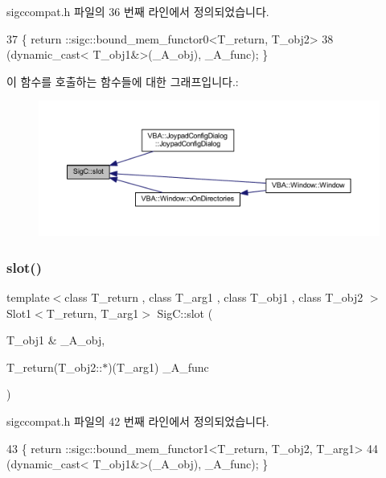 sigccompat.\+h 파일의 36 번째 라인에서 정의되었습니다.


\begin{DoxyCode}
37 \{ return ::sigc::bound\_mem\_functor0<T\_return, T\_obj2>
38              (\textcolor{keyword}{dynamic\_cast<} T\_obj1&\textcolor{keyword}{>}(\_A\_obj), \_A\_func); \}
\end{DoxyCode}
이 함수를 호출하는 함수들에 대한 그래프입니다.\+:
\nopagebreak
\begin{figure}[H]
\begin{center}
\leavevmode
\includegraphics[width=350pt]{namespace_sig_c_a92e4f19202b77e78ac1db05f5a62f6b6_icgraph}
\end{center}
\end{figure}
\mbox{\label{namespace_sig_c_a593d0d3f9fec3996bcdb781f14bff628}} 
\subsubsection{\texorpdfstring{slot()}{slot()}\hspace{0.1cm}{\footnotesize\ttfamily [2/3]}}
{\footnotesize\ttfamily template$<$class T\+\_\+return , class T\+\_\+arg1 , class T\+\_\+obj1 , class T\+\_\+obj2 $>$ \\
Slot1$<$T\+\_\+return, T\+\_\+arg1$>$ Sig\+C\+::slot (\begin{DoxyParamCaption}\item[{T\+\_\+obj1 \&}]{\+\_\+\+A\+\_\+obj,  }\item[{T\+\_\+return(T\+\_\+obj2\+::$\ast$)(T\+\_\+arg1)}]{\+\_\+\+A\+\_\+func }\end{DoxyParamCaption})\hspace{0.3cm}{\ttfamily [inline]}}



sigccompat.\+h 파일의 42 번째 라인에서 정의되었습니다.


\begin{DoxyCode}
43 \{ return ::sigc::bound\_mem\_functor1<T\_return, T\_obj2, T\_arg1>
44              (\textcolor{keyword}{dynamic\_cast<} T\_obj1&\textcolor{keyword}{>}(\_A\_obj), \_A\_func); \}
\end{DoxyCode}
\mbox{\label{namespace_sig_c_a894ae71a244ee5c71e891342ab536db1}} 
